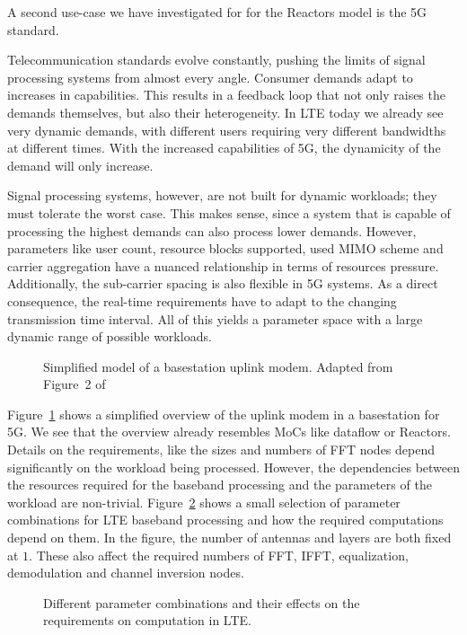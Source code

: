 A second use-case we have investigated for for the Reactors model is the 5G standard. 

Telecommunication standards evolve constantly, pushing the limits of signal processing systems from almost every angle.
Consumer demands adapt to increases in capabilities. This results in a feedback loop that not only raises the demands themselves, but also their heterogeneity.
In \ac{LTE} today we already see very dynamic demands, with different users requiring very different bandwidths at different times.
With the increased capabilities of 5G, the dynamicity of the demand will only increase.

Signal processing systems, however, are not built for dynamic workloads; they must tolerate the worst case.
This makes sense, since a system that is capable of processing the highest demands can also process lower demands.
However, parameters like user count, resource blocks supported, used MIMO scheme and carrier aggregation have a nuanced relationship in terms of resources pressure.
Additionally, the sub-carrier spacing is also flexible in 5G systems.
As a direct consequence, the real-time requirements have to adapt to the changing transmission time interval.
All of this yields a parameter space with a large dynamic range of possible workloads.

\begin{figure}[h]
	\centering
   \resizebox{0.95\textwidth}{!}{}
   \caption{Simplified model of a basestation uplink  modem. Adapted from Figure~2 of~\cite{wittig_ict20}} 
	\label{fig:5g_flow}
\end{figure}

Figure~\ref{fig:5g_flow} shows a simplified overview of the uplink modem in a basestation for 5G. 
We see that the overview already resembles \acp{MoC} like dataflow or Reactors.
Details on the requirements, like the sizes and numbers of \ac{FFT} nodes depend significantly on the workload being processed.
However, the dependencies between the resources required for the baseband processing and the parameters of the workload are non-trivial.
Figure~\ref{fig:5g_radar} shows a small selection of parameter combinations for \ac{LTE} baseband processing and how the required computations depend on them.
In the figure, the number of antennas and layers are both fixed at $1$. These also affect the required numbers of \ac{FFT}, \ac{IFFT}, equalization, demodulation and channel inversion nodes.

\begin{figure}[t]
	\centering
	\caption{Different parameter combinations and their effects on the requirements on computation in \ac{LTE}.}
	\label{fig:5g_radar}
\end{figure}
        
